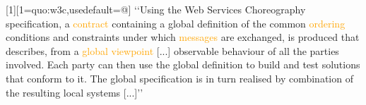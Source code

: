 [1][1=quo:w3c,usedefault=@]{
  \renewcommand{\baselinestretch}{-.15}
	 \lq\lq Using the Web Services Choreography specification, a
	 \textcolor{orange}{contract} containing a global definition of the
	 common \textcolor{orange}{ordering} conditions and constraints
	 under which \textcolor{orange}{messages} are exchanged, is
	 produced that describes, from a \textcolor{orange}{global
		viewpoint} [...]  observable behaviour of all the parties
	 involved.
    \textcolor{OliveGreen}{Each party} can then use the global definition to
    \textcolor{OliveGreen}{build and test solutions that conform to it}.
    The global specification is in turn \textcolor{OliveGreen}{realised by combination of} the
    resulting \textcolor{OliveGreen}{local systems} [...]\rq\rq
}


